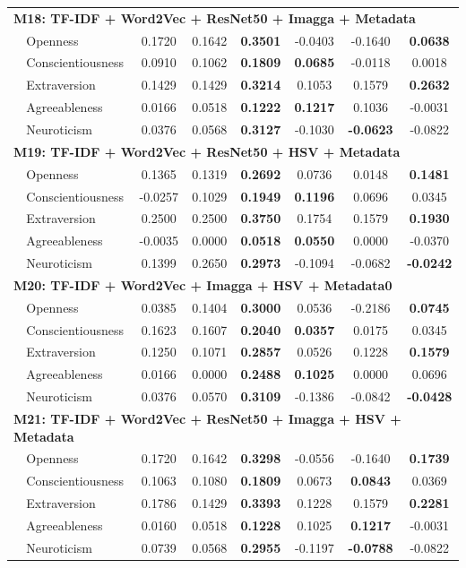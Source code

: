 \begin{longtable}{llcccccc}
\hline
\multicolumn{8}{l}{\textbf{M18: TF-IDF + Word2Vec + ResNet50 + Imagga + Metadata}} \\
& Openness & 0.1720 & 0.1642 & \textbf{0.3501} & -0.0403 & -0.1640 & \textbf{0.0638} \\
& Conscientiousness & 0.0910 & 0.1062 & \textbf{0.1809} & \textbf{0.0685} & -0.0118 & 0.0018 \\
& Extraversion & 0.1429 & 0.1429 & \textbf{0.3214} & 0.1053 & 0.1579 & \textbf{0.2632} \\
& Agreeableness & 0.0166 & 0.0518 & \textbf{0.1222} & \textbf{0.1217} & 0.1036 & -0.0031 \\
& Neuroticism & 0.0376 & 0.0568 & \textbf{0.3127} & -0.1030 & \textbf{-0.0623} & -0.0822 \\
\hline
\multicolumn{8}{l}{\textbf{M19: TF-IDF + Word2Vec + ResNet50 + HSV + Metadata}} \\
& Openness & 0.1365 & 0.1319 & \textbf{0.2692} & 0.0736 & 0.0148 & \textbf{0.1481} \\
& Conscientiousness & -0.0257 & 0.1029 & \textbf{0.1949} & \textbf{0.1196} & 0.0696 & 0.0345 \\
& Extraversion & 0.2500 & 0.2500 & \textbf{0.3750} & 0.1754 & 0.1579 & \textbf{0.1930} \\
& Agreeableness & -0.0035 & 0.0000 & \textbf{0.0518} & \textbf{0.0550} & 0.0000 & -0.0370 \\
& Neuroticism & 0.1399 & 0.2650 & \textbf{0.2973} & -0.1094 & -0.0682 & \textbf{-0.0242} \\
\hline
\multicolumn{8}{l}{\textbf{M20: TF-IDF + Word2Vec + Imagga + HSV + Metadata0}} \\
& Openness & 0.0385 & 0.1404 & \textbf{0.3000} & 0.0536 & -0.2186 & \textbf{0.0745} \\
& Conscientiousness & 0.1623 & 0.1607 & \textbf{0.2040} & \textbf{0.0357} & 0.0175 & 0.0345 \\
& Extraversion & 0.1250 & 0.1071 & \textbf{0.2857} & 0.0526 & 0.1228 & \textbf{0.1579} \\
& Agreeableness & 0.0166 & 0.0000 & \textbf{0.2488} & \textbf{0.1025} & 0.0000 & 0.0696 \\
& Neuroticism & 0.0376 & 0.0570 & \textbf{0.3109} & -0.1386 & -0.0842 & \textbf{-0.0428} \\
\hline
\multicolumn{8}{l}{\textbf{M21: TF-IDF + Word2Vec + ResNet50 + Imagga + HSV + Metadata}} \\
& Openness & 0.1720 & 0.1642 & \textbf{0.3298} & -0.0556 & -0.1640 & \textbf{0.1739} \\
& Conscientiousness & 0.1063 & 0.1080 & \textbf{0.1809} & 0.0673 & \textbf{0.0843} & 0.0369 \\
& Extraversion & 0.1786 & 0.1429 & \textbf{0.3393} & 0.1228 & 0.1579 & \textbf{0.2281} \\
& Agreeableness & 0.0160 & 0.0518 & \textbf{0.1228} & 0.1025 & \textbf{0.1217} & -0.0031 \\
& Neuroticism & 0.0739 & 0.0568 & \textbf{0.2955} & -0.1197 & \textbf{-0.0788} & -0.0822 \\


\end{longtable}
